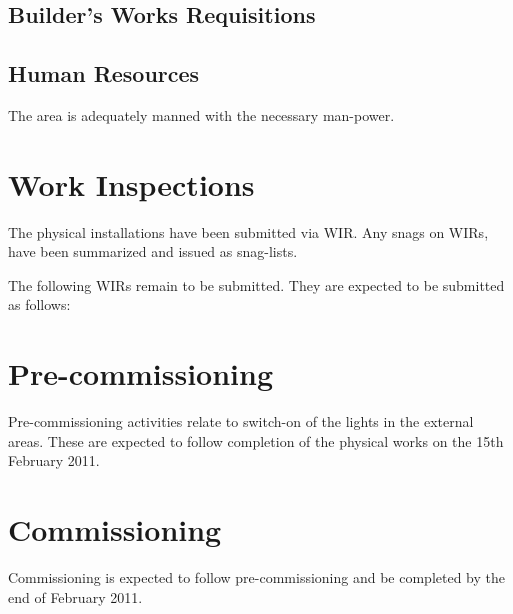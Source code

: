 \subsection{Builder's Works Requisitions}
\subsection{Human Resources}
The area is adequately manned with the necessary man-power.


\section{Work Inspections}

The physical installations have been submitted via WIR. Any snags on WIRs, have been summarized and 
issued as snag-lists.

The following WIRs remain to be submitted. They are expected to be submitted as follows:

\section{Pre-commissioning}

Pre-commissioning activities relate to switch-on of the lights in the external areas. These are expected to follow completion of the physical works on the 15th February 2011.

\section{Commissioning}

Commissioning is expected to follow pre-commissioning and be completed by the end of February 2011.











